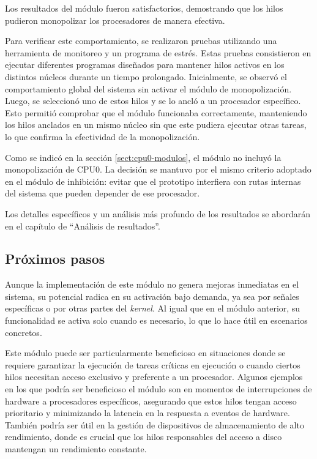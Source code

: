 Los resultados del módulo fueron satisfactorios, demostrando que los hilos pudieron monopolizar los procesadores de manera efectiva.\par

Para verificar este comportamiento, se realizaron pruebas utilizando una herramienta de monitoreo y un programa de estrés. Estas pruebas consistieron en ejecutar diferentes programas diseñados para mantener hilos activos en los distintos núcleos durante un tiempo prolongado. Inicialmente, se observó el comportamiento global del sistema sin activar el módulo de monopolización. Luego, se seleccionó uno de estos hilos y se lo ancló a un procesador específico. Esto permitió comprobar que el módulo funcionaba correctamente, manteniendo los hilos anclados en un mismo núcleo sin que este pudiera ejecutar otras tareas, lo que confirma la efectividad de la monopolización.\par

Como se indicó en la sección \ref{sect:cpu0-modulos}, el módulo no incluyó la monopolización de CPU0. La decisión se mantuvo por el mismo criterio adoptado en el módulo de inhibición: evitar que el prototipo interfiera con rutas internas del sistema que pueden depender de ese procesador.\par

Los detalles específicos y un análisis más profundo de los resultados se abordarán en el capítulo de “Análisis de resultados”.\par

\subsection{Próximos pasos}

Aunque la implementación de este módulo no genera mejoras inmediatas en el sistema, su potencial radica en su activación bajo demanda, ya sea por señales específicas o por otras partes del \textit{kernel}. Al igual que en el módulo anterior, su funcionalidad se activa solo cuando es necesario, lo que lo hace útil en escenarios concretos.\par

Este módulo puede ser particularmente beneficioso en situaciones donde se requiere garantizar la ejecución de tareas críticas en ejecución o cuando ciertos hilos necesitan acceso exclusivo y preferente a un procesador. Algunos ejemplos en los que podría ser beneficioso el módulo son en momentos de interrupciones de hardware a procesadores específicos, asegurando que estos hilos tengan acceso prioritario y minimizando la latencia en la respuesta a eventos de hardware. También podría ser útil en la gestión de dispositivos de almacenamiento de alto rendimiento, donde es crucial que los hilos responsables del acceso a disco mantengan un rendimiento constante.\par

